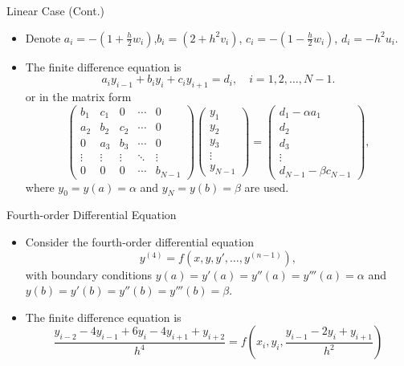 \documentclass{beamer}
\begin{document}
\begin{frame}{Linear Case (Cont.)}
    \begin{itemize}
        \item Denote
     $a_i = -\left(1+\frac{h}{2} w_i\right)$,$ b_i = \left(2+h^2 v_i\right)$,
     $c_i = -\left(1-\frac{h}{2} w_i\right)$, $ d_i = -h^2 u_i$.
       \item The finite difference equation is 
     \[
        a_i y_{i-1} + b_i y_i + c_i y_{i+1} = d_i, \quad i=1, 2, \ldots, N-1.
     \]
     or in the matrix form
        \[
        \begin{pmatrix}
            b_1 & c_1 & 0 & \cdots & 0 \\
            a_2 & b_2 & c_2 & \cdots & 0 \\
            0 & a_3 & b_3 & \cdots & 0 \\
            \vdots & \vdots & \vdots & \ddots & \vdots \\
            0 & 0 & 0 & \cdots & b_{N-1}
        \end{pmatrix} \begin{pmatrix}
            y_1 \\ y_2 \\ y_3\\\vdots \\ y_{N-1}  
        \end{pmatrix} = \begin{pmatrix}
            d_1-\alpha a_1 \\ d_2 \\d_3 \\ \vdots \\ d_{N-1}-\beta c_{N-1}
        \end{pmatrix},   
        \]
        where $y_0=y(a)=\alpha$ and $y_N=y(b)=\beta$ are used. 
    \end{itemize}

\end{frame}
\begin{frame}{Fourth-order Differential Equation}
    \begin{itemize}
        \item Consider the fourth-order differential equation 
        \[
        y^{(4)} = f(x, y, y', \ldots, y^{(n-1)}),  
        \]
        with boundary conditions $y(a)=y'(a)=y''(a)=y'''(a)=\alpha$ and $y(b)=y'(b)=y''(b)=y'''(b)=\beta$.
        \item The finite difference equation is
        \[
            \frac{y_{i-2}-4 y_{i-1}+6 y_i-4 y_{i+1}+y_{i+2}}{h^4}=f\left(x_i, y_i, \frac{y_{i-1}-2 y_i+y_{i+1}}{h^2}\right)
        \]

    \end{itemize}
\end{frame}
\end{document}
